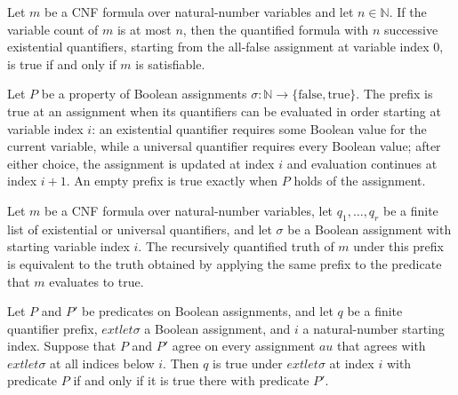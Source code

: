 \begin{theorem}
\label{Complexity.QBF.truth_exPrefix_iff_satisfiable}
\leanok
{}
Let $m$ be a CNF formula over natural-number variables and let $n\in\mathbb{N}$. If the
variable count of $m$ is at most $n$, then the quantified formula with $n$ successive
existential quantifiers, starting from the all-false assignment at variable index $0$,
is true if and only if $m$ is satisfiable.
\end{theorem}

\begin{definition}
\label{Complexity.QBF.PrefixTruth}
\leanok
{}
Let $P$ be a property of Boolean assignments $\sigma : \mathbb{N} \to
\{\mathrm{false},\mathrm{true}\}$. The prefix is true at an assignment when its
quantifiers can be evaluated in order starting at variable index $i$: an existential
quantifier requires some Boolean value for the current variable, while a universal
quantifier requires every Boolean value; after either choice, the assignment is updated
at index $i$ and evaluation continues at index $i+1$. An empty prefix is true exactly
when $P$ holds of the assignment.
\end{definition}

\begin{theorem}
\label{Complexity.QBF.truthAux_iff_prefixTruth}
\leanok
{}
Let $m$ be a CNF formula over natural-number variables, let $q_1,\ldots,q_r$ be a finite
list of existential or universal quantifiers, and let $\sigma$ be a Boolean assignment
with starting variable index $i$. The recursively quantified truth of $m$ under this
prefix is equivalent to the truth obtained by applying the same prefix to the predicate
that $m$ evaluates to true.
\end{theorem}

\begin{theorem}
\label{Complexity.QBF.prefixTruth_congr_agree}
\leanok
{}
Let $P$ and $P'$ be predicates on Boolean assignments, and let $q$ be a finite
quantifier prefix, $	ext{ let }
\sigma$ a Boolean assignment, and $i$ a natural-number starting index. Suppose that $P$
and $P'$ agree on every assignment $	au$ that agrees with $	ext{ let }
\sigma$ at all indices below $i$. Then $q$ is true under $	ext{ let }
\sigma$ at index $i$ with predicate $P$ if and only if it is true there with predicate
$P'$.
\end{theorem}

